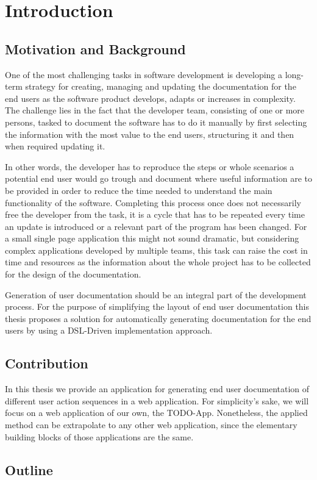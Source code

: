 \chapter{Introduction}
\section{Motivation and Background}
One of the most challenging tasks in software development is developing a long-term strategy for creating, managing and updating the documentation for the end users as the software product develops, adapts or increases in complexity. The challenge lies in the fact that the developer team, consisting of one or more persons, tasked to document the software has to do it manually by first selecting the information with the most value to the end users, structuring it and then when required updating it.

In other words, the developer has to reproduce the steps or whole scenarios a potential end user would go trough and document where useful information are to be provided in order to reduce the time needed to understand the main functionality of the software. Completing this process once does not necessarily free the developer from the task, it is a cycle that has to be repeated every time an update is introduced or a relevant part of the program has been changed. For a small single page application this might not sound dramatic, but considering complex applications developed by multiple teams, this task can raise the cost in time and resources as the information about the whole project has to be collected for the design of the documentation\cite{5712775}.

Generation of user documentation should be an integral part of the development process. For the purpose of simplifying the layout of end user documentation this thesis proposes a solution for automatically generating documentation for the end users by using a DSL-Driven implementation approach.
\section{Contribution}
In this thesis we provide an application for generating end user documentation of different user action sequences in a web application. For simplicity's sake, we will focus on a web application of our own, the TODO-App. Nonetheless, the applied method can be extrapolate to any other web application, since the elementary building blocks of those applications are the same.
\section{Outline}